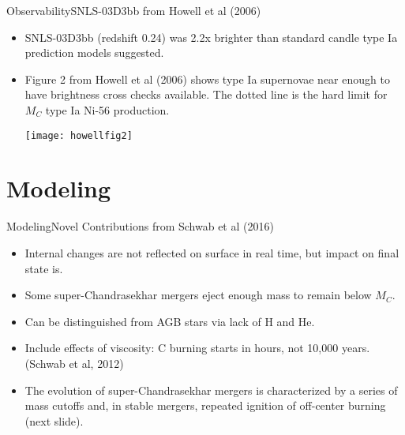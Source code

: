 \documentclass{beamer}
\begin{document}
\begin{frame}{Observability}{SNLS-03D3bb from Howell et al (2006)}
\begin{itemize}
      \item{SNLS-03D3bb (redshift 0.24) was 2.2x brighter than standard candle type Ia prediction models suggested.}
    \item {Figure 2 from Howell et al (2006) shows type Ia supernovae near enough to have brightness cross checks available. The dotted line is the hard limit for $M_C$ type Ia Ni-56 production.}
\begin{center}\texttt{[image: howellfig2]}\end{center}
\end{itemize}
\end{frame}

\section{Modeling}

\begin{frame}{Modeling}{Novel Contributions from Schwab et al (2016)}
  \begin{itemize}
    \item {Internal changes are not reflected on surface in real time, but impact on final state is.}
    \item {Some super-Chandrasekhar mergers eject enough mass to remain below $M_C$.}
    \item {Can be distinguished from AGB stars via lack of H and He.}
    \item {Include effects of viscosity: C burning starts in hours, not 10,000 years. (Schwab et al, 2012)}
    \item {The evolution of super-Chandrasekhar mergers is characterized by a series of mass cutoffs and, in stable mergers, repeated ignition of off-center burning (next slide).}
\end{itemize}
\end{frame}
\end{document}
